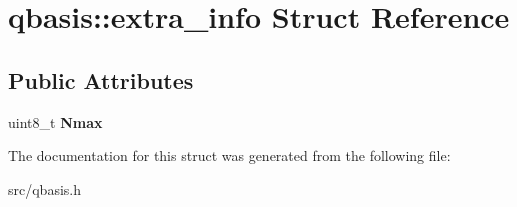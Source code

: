 \hypertarget{structqbasis_1_1extra__info}{}\section{qbasis\+:\+:extra\+\_\+info Struct Reference}
\label{structqbasis_1_1extra__info}
\subsection*{Public Attributes}
\begin{DoxyCompactItemize}
\item 
\mbox{\label{structqbasis_1_1extra__info_a2e87b8e6552ad93094911bf8a042a772}} 
uint8\+\_\+t {\bfseries Nmax}
\end{DoxyCompactItemize}


The documentation for this struct was generated from the following file\+:\begin{DoxyCompactItemize}
\item 
src/qbasis.\+h\end{DoxyCompactItemize}
